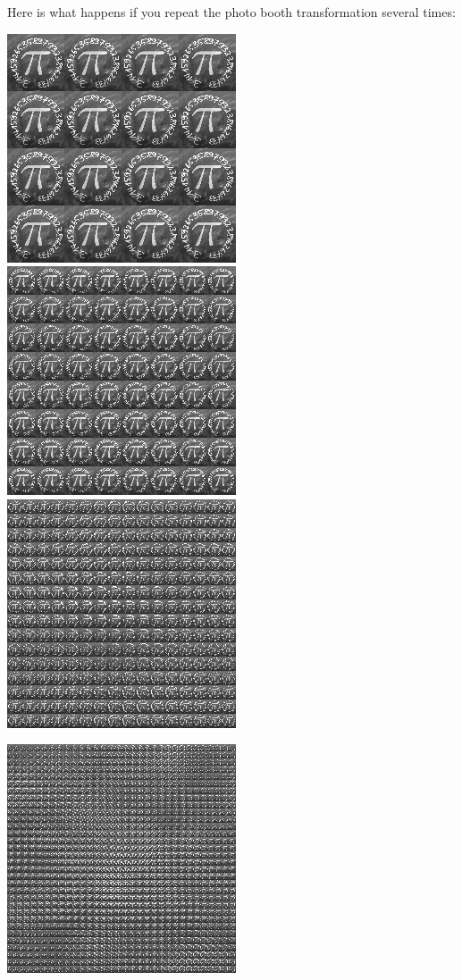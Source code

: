 \documentclass[11pt,class=report,crop=false]{standalone}
\begin{document}
\begin{cours}
Here is what happens if you repeat the photo booth transformation several times:
\begin{center}
\includegraphics[scale=\myscale,scale=0.3]{images_chapter/pi_gimp_new_photo_2.png}\qquad
\includegraphics[scale=\myscale,scale=0.3]{images_chapter/pi_gimp_new_photo_3.png}\qquad
\includegraphics[scale=\myscale,scale=0.3]{images_chapter/pi_gimp_new_photo_4.png}
\end{center}
\begin{center}
\includegraphics[scale=\myscale,scale=0.3]{images_chapter/pi_gimp_new_photo_5.png}\qquad

\end{center}
\end{cours}
\end{document}
